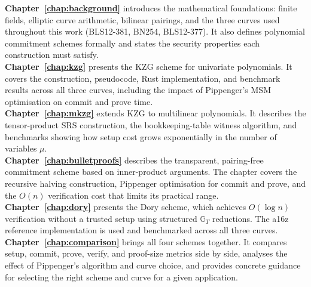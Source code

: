 \textbf{Chapter~\ref{chap:background}} introduces the
mathematical foundations: finite fields, elliptic curve arithmetic,
bilinear pairings, and the three curves used throughout this work
(BLS12-381, BN254, BLS12-377). It also defines polynomial commitment
schemes formally and states the security properties each construction
must satisfy.
\\
\textbf{Chapter~\ref{chap:kzg}} presents
the KZG scheme for univariate polynomials. It covers the construction,
pseudocode, Rust implementation, and benchmark results across all three
curves, including the impact of Pippenger's MSM optimisation on commit
and prove time.
\\
\textbf{Chapter~\ref{chap:mkzg}} extends KZG to multilinear polynomials. It describes the
tensor-product SRS construction, the bookkeeping-table witness
algorithm, and benchmarks showing how setup cost grows exponentially
in the number of variables $\mu$.
\\
\textbf{Chapter~\ref{chap:bulletproofs}} describes
the transparent, pairing-free commitment scheme based on inner-product
arguments. The chapter covers the recursive halving construction,
Pippenger optimisation for commit and prove, and the $O(n)$
verification cost that limits its practical range.
\\
\textbf{Chapter~\ref{chap:dory}}
presents the Dory scheme, which achieves $O(\log n)$ verification
without a trusted setup using structured $\mathbb{G}_T$ reductions.
The a16z reference implementation is used and benchmarked across all
three curves.
\\
\textbf{Chapter~\ref{chap:comparison}}
brings all four schemes together. It compares setup, commit, prove,
verify, and proof-size metrics side by side, analyses the effect of
Pippenger's algorithm and curve choice, and provides concrete guidance
for selecting the right scheme and curve for a given application.

